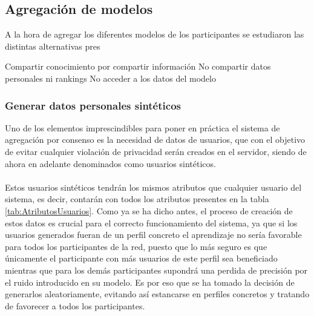 \subsection{Agregación de modelos}\label{Consenso}
A la hora de agregar los diferentes modelos de los participantes se estudiaron las distintas alternativas pres


Compartir conocimiento por compartir información
No compartir datos personales ni rankings
No acceder a los datos del modelo

\subsubsection{Generar datos personales sintéticos}\label{Consenso:Usuarios_Sinteticos}
Uno de los elementos imprescindibles para poner en práctica el sistema de agregación por consenso es la necesidad de datos de usuarios, que con el objetivo de evitar cualquier violación de privacidad serán creados en el servidor, siendo de ahora en adelante denominados como usuarios sintéticos.
\\ \\
Estos usuarios sintéticos tendrán los mismos atributos que cualquier usuario del sistema, es decir, contarán con todos los atributos presentes en la tabla \ref{tab:AtributosUsuarios}. Como ya se ha dicho antes, el proceso de creación de estos datos es crucial para el correcto funcionamiento del sistema, ya que si los usuarios generados fueran de un perfil concreto el aprendizaje no sería favorable para todos los participantes de la red, puesto que lo más seguro es que únicamente el participante con más usuarios de este perfil sea beneficiado mientras que para los demás participantes supondrá una perdida de precisión por el ruido introducido en su modelo. Es por eso que se ha tomado la decisión de generarlos aleatoriamente, evitando así estancarse en perfiles concretos y tratando de favorecer a todos los participantes. 
\newpage
